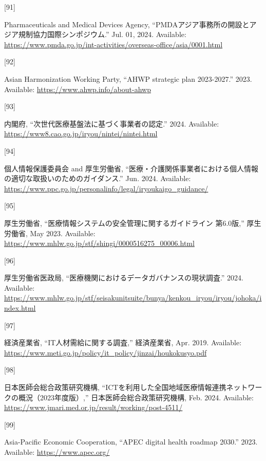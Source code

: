 \documentclass[
  a4paper,
  a4paper,
  11pt]{ltjsbook}
\newlength{\cslhangindent}
\newlength{\csllabelwidth}
\newenvironment{CSLReferences}[2] %
 {\begin{list}{}{%
  \setlength{\itemindent}{0pt}
  \setlength{\leftmargin}{0pt}
  \setlength{\parsep}{0pt}
  \ifodd #1
   \setlength{\leftmargin}{\cslhangindent}
   \setlength{\itemindent}{-1\cslhangindent}
  \fi
  \setlength{\itemsep}{#2\baselineskip}}}
 {\end{list}}
\newcommand{\CSLLeftMargin}[1]{\parbox[t]{\csllabelwidth}{\strut#1\strut}}
\newcommand{\CSLRightInline}[1]{\parbox[t]{\linewidth - \csllabelwidth}{\strut#1\strut}}
\begin{document}
\begin{CSLReferences}{0}{0}
\CSLLeftMargin{{[}91{]} }%
\CSLRightInline{Pharmaceuticals and Medical Devices Agency,
{``PMDAアジア事務所の開設とアジア規制協力国際シンポジウム.''} Jul. 01,
2024. Available:
\url{https://www.pmda.go.jp/int-activities/overseas-office/asia/0001.html}}

\CSLLeftMargin{{[}92{]} }%
\CSLRightInline{Asian Harmonization Working Party, {``AHWP strategic
plan 2023-2027.''} 2023. Available:
\url{https://www.ahwp.info/about-ahwp}}

\CSLLeftMargin{{[}93{]} }%
\CSLRightInline{内閣府, {``次世代医療基盤法に基づく事業者の認定.''}
2024. Available: \url{https://www8.cao.go.jp/iryou/nintei/nintei.html}}

\CSLLeftMargin{{[}94{]} }%
\CSLRightInline{個人情報保護委員会 and 厚生労働省,
{``医療・介護関係事業者における個人情報の適切な取扱いのためのガイダンス.''}
Jun. 2024. Available:
\url{https://www.ppc.go.jp/personalinfo/legal/iryoukaigo_guidance/}}

\CSLLeftMargin{{[}95{]} }%
\CSLRightInline{厚生労働省,
{``医療情報システムの安全管理に関するガイドライン 第6.0版,''}
厚生労働省, May 2023. Available:
\url{https://www.mhlw.go.jp/stf/shingi/0000516275_00006.html}}

\CSLLeftMargin{{[}96{]} }%
\CSLRightInline{厚生労働省医政局,
{``医療機関におけるデータガバナンスの現状調査.''} 2024. Available:
\url{https://www.mhlw.go.jp/stf/seisakunitsuite/bunya/kenkou_iryou/iryou/johoka/index.html}}

\CSLLeftMargin{{[}97{]} }%
\CSLRightInline{経済産業省, {``IT人材需給に関する調査,''} 経済産業省,
Apr. 2019. Available:
\url{https://www.meti.go.jp/policy/it_policy/jinzai/houkokusyo.pdf}}

\CSLLeftMargin{{[}98{]} }%
\CSLRightInline{日本医師会総合政策研究機構,
{``ICTを利用した全国地域医療情報連携ネットワークの概況（2023年度版）,''}
日本医師会総合政策研究機構, Feb. 2024. Available:
\url{https://www.jmari.med.or.jp/result/working/post-4511/}}

\CSLLeftMargin{{[}99{]} }%
\CSLRightInline{Asia-Pacific Economic Cooperation, {``APEC digital
health roadmap 2030.''} 2023. Available: \url{https://www.apec.org/}}


\end{CSLReferences}
\end{document}
